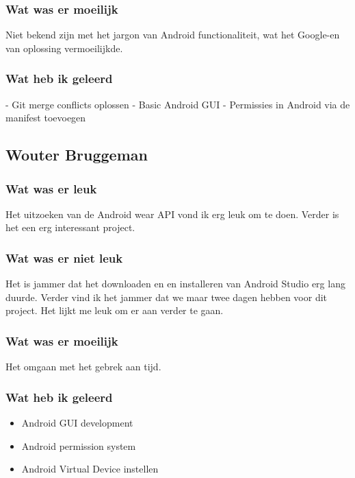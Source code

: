 \documentclass[../main.tex]{subfiles}
\begin{document}
\subsubsection{Wat was er moeilijk}
Niet bekend zijn met het jargon van Android functionaliteit, wat het Google-en van oplossing
vermoeilijkde.
\subsubsection{Wat heb ik geleerd}
- Git merge conflicts oplossen
- Basic Android GUI
- Permissies in Android via de manifest toevoegen
\newpage

\subsection{Wouter Bruggeman}
\subsubsection{Wat was er leuk}
Het uitzoeken van de Android wear API vond ik erg leuk om te doen. Verder is het een erg
interessant project.
\subsubsection{Wat was er niet leuk}
Het is jammer dat het downloaden en en installeren van Android Studio erg lang duurde.
Verder vind ik het jammer dat we maar twee dagen hebben voor dit project. Het lijkt me leuk
om er aan verder te gaan.
\subsubsection{Wat was er moeilijk}
Het omgaan met het gebrek aan tijd.
\subsubsection{Wat heb ik geleerd}
\begin{itemize}
	\item Android GUI development
	\item Android permission system
	\item Android Virtual Device instellen
\end{itemize}
\newpage
\end{document}
